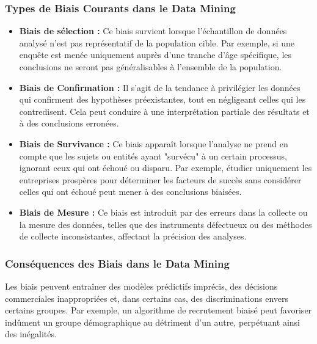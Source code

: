 \documentclass[a4paper,12pt]{article}
\begin{document}
		\subsubsection{Types de Biais Courants dans le Data Mining}
			\begin{itemize}
				\item \textbf{Biais de sélection :} Ce biais survient lorsque l'échantillon de données analysé n'est pas représentatif de la population cible. Par exemple, si une enquête est menée uniquement auprès d'une tranche d'âge spécifique, les conclusions ne seront pas généralisables à l'ensemble de la population.​
				\item \textbf{Biais de Confirmation :} Il s'agit de la tendance à privilégier les données qui confirment des hypothèses préexistantes, tout en négligeant celles qui les contredisent. Cela peut conduire à une interprétation partiale des résultats et à des conclusions erronées.​
				\item \textbf{Biais de Survivance :} Ce biais apparaît lorsque l'analyse ne prend en compte que les sujets ou entités ayant "survécu" à un certain processus, ignorant ceux qui ont échoué ou disparu. Par exemple, étudier uniquement les entreprises prospères pour déterminer les facteurs de succès sans considérer celles qui ont échoué peut mener à des conclusions biaisées.​
				\item \textbf{Biais de Mesure :} Ce biais est introduit par des erreurs dans la collecte ou la mesure des données, telles que des instruments défectueux ou des méthodes de collecte inconsistantes, affectant la précision des analyses.​
			\end{itemize}
			
		\subsubsection{Conséquences des Biais dans le Data Mining}
			Les biais peuvent entraîner des modèles prédictifs imprécis, des décisions commerciales inappropriées et, dans certains cas, des discriminations envers certains groupes. Par exemple, un algorithme de recrutement biaisé peut favoriser indûment un groupe démographique au détriment d'un autre, perpétuant ainsi des inégalités.
\end{document}
